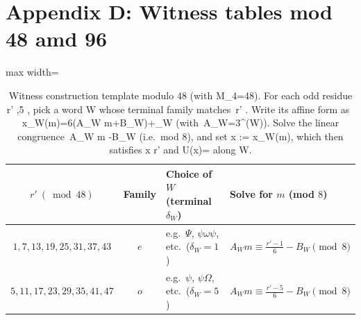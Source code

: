 \documentclass[11pt,letterpaper]{amsart}
\def\mathrm#1{#1}%
\def\({}%
\def\){}%
\theoremstyle{definition}
\theoremstyle{plain}
\theoremstyle{plain}
\theoremstyle{remark}
\begin{document}
\newpage

\section*{Appendix D: Witness tables mod 48 amd 96}

\begin{table}[!htbp]
\centering
\caption{Witness construction template modulo \texorpdfstring{\(48\)}{48} (with \texorpdfstring{\(M_4=48\)}{M4=48}).
For each odd residue \texorpdfstring{\(r' ,5 \)}{r' congruent 1,5 mod 6}, pick a word \(W\) whose terminal family matches \(\,r' \).
Write its affine form as \(\,x_W(m)=6(A_W m+B_W)+\delta_W\) (with \(\,A_W=3^{\alpha(W)}\)).
Solve the linear congruence \(\,A_W m \equiv {}-B_W \) (i.e.\ mod \(8\)),
and set \(x := x_W(m)\), which then satisfies \(x \equiv r' \) and \(U(x)=\) along \(W\).}

\label{tab:witnesses-mod-48-template}
\begin{adjustbox}{max width=\textwidth}
\begin{tabular}{@{}c c l l@{}}
\toprule
$r' \ (\bmod 48)$ & Family & Choice of $W$ (terminal $\delta_W$) & Solve for $m$ (mod $8$) \\ \midrule
$1,7,13,19,25,31,37,43$   & $\mathrm e$ & e.g.\ $\Psi$, $\psi\omega\psi$, etc.\ ($\delta_W{=}1$) & $A_W m \equiv \tfrac{r'-1}{6}-B_W \pmod{8}$\\
$5,11,17,23,29,35,41,47$ & $\mathrm o$ & e.g.\ $\psi$, $\psi\Omega$, etc.\ ($\delta_W{=}5$) & $A_W m \equiv \tfrac{r'-5}{6}-B_W \pmod{8}$\\
\bottomrule
\end{tabular}
\end{adjustbox}
\end{table}
\end{document}
